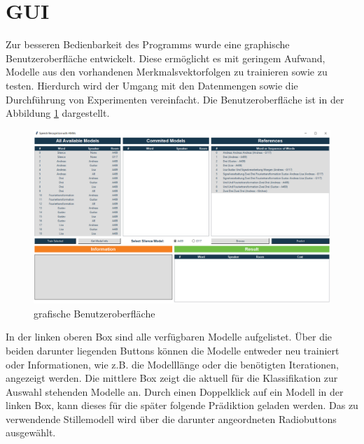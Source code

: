 



\newpage
\section{GUI}

Zur besseren Bedienbarkeit des Programms wurde eine graphische Benutzeroberfläche entwickelt.
Diese ermöglicht es mit geringem Aufwand, Modelle aus den vorhandenen Merkmalsvektorfolgen zu trainieren sowie zu testen.
Hierdurch wird der Umgang mit den Datenmengen sowie die Durchführung von Experimenten vereinfacht. %
Die Benutzeroberfläche ist in der Abbildung \ref{fig:gui} dargestellt.


\medskip
\begin{figure}[tbph!]
\centering
\includegraphics[width=0.92\linewidth]{grafic/gui}
\caption{grafische Benutzeroberfläche}
\label{fig:gui}
\end{figure}


In der linken oberen Box sind alle verfügbaren Modelle aufgelistet.
Über die beiden darunter liegenden Buttons können die Modelle entweder neu trainiert oder Informationen, wie z.B. die Modelllänge oder die benötigten Iterationen, angezeigt werden.
Die mittlere Box zeigt die aktuell für die Klassifikation zur Auswahl stehenden Modelle an.
Durch einen Doppelklick auf ein Modell in der linken Box, kann dieses für die später folgende Prädiktion geladen werden.
Das zu verwendende Stillemodell wird über die darunter angeordneten Radiobuttons ausgewählt.

